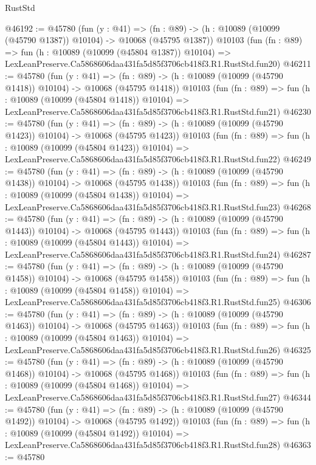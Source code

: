 \begin{lexlean}{RustStd}
\begin{coremodule}
@46192 := @45780
    (fun (y : @41) =>
    (fn : @89) -> (h : @10089 (@10099 (@45790 @1387)) @10104) -> @10068 (@45795 @1387))
    @10103
    (fun (fn : @89) =>
    fun (h : @10089 (@10099 (@45804 @1387)) @10104) =>
    LexLeanPreserve.Ca5868606daa431fa5d85f3706cb418f3.R1.RustStd.fun20)
@46211 := @45780
    (fun (y : @41) =>
    (fn : @89) -> (h : @10089 (@10099 (@45790 @1418)) @10104) -> @10068 (@45795 @1418))
    @10103
    (fun (fn : @89) =>
    fun (h : @10089 (@10099 (@45804 @1418)) @10104) =>
    LexLeanPreserve.Ca5868606daa431fa5d85f3706cb418f3.R1.RustStd.fun21)
@46230 := @45780
    (fun (y : @41) =>
    (fn : @89) -> (h : @10089 (@10099 (@45790 @1423)) @10104) -> @10068 (@45795 @1423))
    @10103
    (fun (fn : @89) =>
    fun (h : @10089 (@10099 (@45804 @1423)) @10104) =>
    LexLeanPreserve.Ca5868606daa431fa5d85f3706cb418f3.R1.RustStd.fun22)
@46249 := @45780
    (fun (y : @41) =>
    (fn : @89) -> (h : @10089 (@10099 (@45790 @1438)) @10104) -> @10068 (@45795 @1438))
    @10103
    (fun (fn : @89) =>
    fun (h : @10089 (@10099 (@45804 @1438)) @10104) =>
    LexLeanPreserve.Ca5868606daa431fa5d85f3706cb418f3.R1.RustStd.fun23)
@46268 := @45780
    (fun (y : @41) =>
    (fn : @89) -> (h : @10089 (@10099 (@45790 @1443)) @10104) -> @10068 (@45795 @1443))
    @10103
    (fun (fn : @89) =>
    fun (h : @10089 (@10099 (@45804 @1443)) @10104) =>
    LexLeanPreserve.Ca5868606daa431fa5d85f3706cb418f3.R1.RustStd.fun24)
@46287 := @45780
    (fun (y : @41) =>
    (fn : @89) -> (h : @10089 (@10099 (@45790 @1458)) @10104) -> @10068 (@45795 @1458))
    @10103
    (fun (fn : @89) =>
    fun (h : @10089 (@10099 (@45804 @1458)) @10104) =>
    LexLeanPreserve.Ca5868606daa431fa5d85f3706cb418f3.R1.RustStd.fun25)
@46306 := @45780
    (fun (y : @41) =>
    (fn : @89) -> (h : @10089 (@10099 (@45790 @1463)) @10104) -> @10068 (@45795 @1463))
    @10103
    (fun (fn : @89) =>
    fun (h : @10089 (@10099 (@45804 @1463)) @10104) =>
    LexLeanPreserve.Ca5868606daa431fa5d85f3706cb418f3.R1.RustStd.fun26)
@46325 := @45780
    (fun (y : @41) =>
    (fn : @89) -> (h : @10089 (@10099 (@45790 @1468)) @10104) -> @10068 (@45795 @1468))
    @10103
    (fun (fn : @89) =>
    fun (h : @10089 (@10099 (@45804 @1468)) @10104) =>
    LexLeanPreserve.Ca5868606daa431fa5d85f3706cb418f3.R1.RustStd.fun27)
@46344 := @45780
    (fun (y : @41) =>
    (fn : @89) -> (h : @10089 (@10099 (@45790 @1492)) @10104) -> @10068 (@45795 @1492))
    @10103
    (fun (fn : @89) =>
    fun (h : @10089 (@10099 (@45804 @1492)) @10104) =>
    LexLeanPreserve.Ca5868606daa431fa5d85f3706cb418f3.R1.RustStd.fun28)
@46363 := @45780

\end{coremodule}
\end{lexlean}
